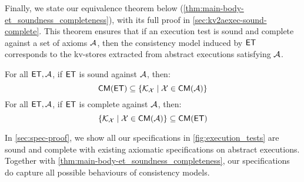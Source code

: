 Finally, we state our equivalence theorem below (\cref{thm:main-body-et_soundness_completeness}), with its full proof in \cref{sec:kv2aexec-sound-complete}. 
This theorem ensures that if an execution test is sound and complete against a set of axioms $\mathcal{A}$, 
then the consistency model induced by $\mathsf{ET}$ corresponds to the kv-stores extracted from abstract executions satisfying $\mathcal{A}$.

\begin{theorem}
\label{thm:main-body-et_soundness_completeness}
For all $\mathsf{ET}, \mathcal{A}$, if $\mathsf{ET}$ is sound against $\mathcal{A}$, then:
\[
    \mathsf{CM}(\mathsf{ET}) \subseteq \{ \mathcal{K}_{\mathcal{X}} \mid \mathcal{X} \in \mathsf{CM}(\mathcal{A})\}
\]
For all $\mathsf{ET}, \mathcal{A}$, if $\mathsf{ET}$ is complete against $\mathcal{A}$, then:
\[
    \{ \mathcal{K}_{\mathcal{X}} \mid \mathcal{X} \in \mathsf{CM}(\mathcal{A})\}  \subseteq \mathsf{CM}(\mathsf{ET})
\]
\end{theorem} 

In \cref{sec:spec-proof}, we show all our specifications in \cref{fig:execution_tests} 
are sound and complete with existing axiomatic specifications on abstract executions.
Together with \cref{thm:main-body-et_soundness_completeness}, 
our specifications do capture all possible behaviours of consistency models.


 

